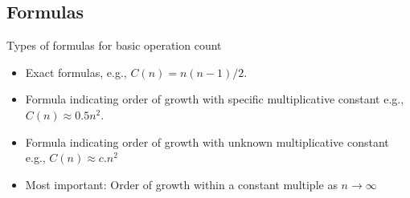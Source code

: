\documentclass[english,10pt,table]{beamer}
\begin{document}
\subsection{Formulas}
\begin{frame}{Types of formulas for basic operation count}
		
	\begin{block}{}
	 	 \begin{itemize}\small
		 \item Exact formulas, e.g., \alert{$C(n) = n(n-1)/2$}.
		 \item <2-> Formula indicating order of growth with specific multiplicative constant
            e.g., \alert{$C(n) \approx 0.5 n^2$}.
		 \item <3-> Formula indicating order of growth with unknown multiplicative constant
            e.g., \alert{$C(n) \approx c.n^2$}
		 \item <4-> Most important: Order of growth within a constant multiple as \alert{$n \rightarrow \infty$}
		\end{itemize}
  \end{block}	
\end{frame}
\end{document}
